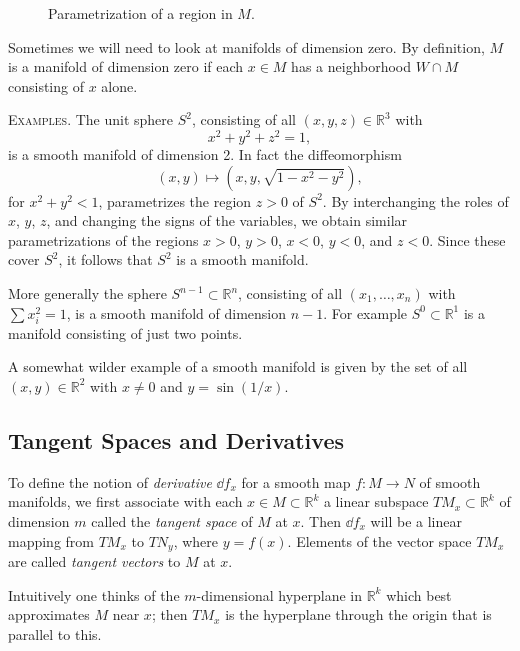 
\begin{figure}[htbp]
\centering
\setcounter{figure}{0}%
\caption{Parametrization of a region in $M$.}\label{fig:milnor-01}
\end{figure}

Sometimes we will need to look at manifolds of dimension zero. By definition, $M$ is a manifold of dimension zero if each $x \in M$ has a neighborhood $W \cap M$ consisting of $x$ alone.

\textsc{Examples.} The unit sphere $S^2$, consisting of all $(x, y, z) \in \mathbb{R}^{3}$ with
\[
x^2 + y^2 + z^2 = 1,
\]
is a smooth manifold of dimension 2. In fact the diffeomorphism
\[
(x, y) \mapsto (x, y, \sqrt{1 - x^2 - y^2}),
\]
for $x^2 + y^2 < 1$, parametrizes the region $z > 0$ of $S^2$. By interchanging the roles of $x$, $y$, $z$, and changing the signs of the variables, we obtain similar parametrizations of the regions $x > 0$, $y > 0$, $x < 0$, $y < 0$, and $z < 0$. Since these cover $S^2$, it follows that $S^2$ is a smooth manifold.

More generally the sphere $S^{n-1} \subset \mathbb{R}^{n}$, consisting of all $(x_1, \ldots, x_n)$ with $\sum x_i^2 = 1$, is a smooth manifold of dimension $n - 1$. For example $S^0 \subset \mathbb{R}^{1}$ is a manifold consisting of just two points.

A somewhat wilder example of a smooth manifold is given by the set of all $(x, y) \in \mathbb{R}^{2}$ with $x \neq 0$ and $y = \sin(1/x)$.

\subsection{Tangent Spaces and Derivatives}

To define the notion of \textit{derivative} $\dd f_x$ for a smooth map $f : M \to N$ of smooth manifolds, we first associate with each $x \in M \subset \mathbb{R}^{k}$ a linear subspace $TM_x \subset \mathbb{R}^{k}$ of dimension $m$ called the \textit{tangent space} of $M$ at $x$. Then $\dd f_x$ will be a linear mapping from $TM_x$ to $TN_y$, where $y = f(x)$. Elements of the vector space $TM_x$ are called \textit{tangent vectors} to $M$ at $x$.

Intuitively one thinks of the $m$-dimensional hyperplane in $\mathbb{R}^{k}$ which best approximates $M$ near $x$; then $TM_x$ is the hyperplane through the origin that is parallel to this.


